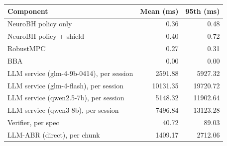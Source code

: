 \begin{tabular}{lrr}
\toprule
Component & Mean (ms) & 95th (ms) \\
\midrule
NeuroBH policy only & 0.36 & 0.48 \\
NeuroBH policy + shield & 0.40 & 0.72 \\
RobustMPC & 0.27 & 0.31 \\
BBA & 0.00 & 0.00 \\
LLM service (glm-4-9b-0414), per session & 2591.88 & 5927.32 \\
LLM service (glm-4-flash), per session & 10131.35 & 19720.72 \\
LLM service (qwen2.5-7b), per session & 5148.32 & 11902.64 \\
LLM service (qwen3-8b), per session & 7496.84 & 13123.28 \\
Verifier, per spec & 40.72 & 89.03 \\
LLM-ABR (direct), per chunk & 1409.17 & 2712.06 \\
\bottomrule
\end{tabular}